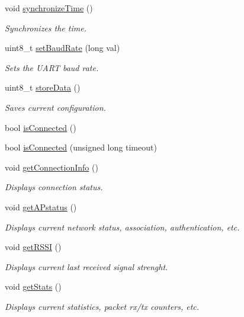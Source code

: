 \begin{DoxyCompactItemize}
void \hyperlink{class_wasp_w_i_f_i_a2820426efd02c54720556c9230cafd41}{synchronize\+Time} ()
\begin{DoxyCompactList}\small\item\em Synchronizes the time. \end{DoxyCompactList}\item 
uint8\+\_\+t \hyperlink{class_wasp_w_i_f_i_ac33882a9b81ce81a5e13577c723faf6c}{set\+Baud\+Rate} (long val)
\begin{DoxyCompactList}\small\item\em Sets the U\+A\+RT baud rate. \end{DoxyCompactList}\item 
uint8\+\_\+t \hyperlink{class_wasp_w_i_f_i_acbf11e3a125d0e28ea1b35343fb8315f}{store\+Data} ()
\begin{DoxyCompactList}\small\item\em Saves current configuration. \end{DoxyCompactList}\item 
bool \hyperlink{class_wasp_w_i_f_i_a2b1a4a23bf96132a0260e8dfe1efff1b}{is\+Connected} ()
\item 
bool \hyperlink{class_wasp_w_i_f_i_ae6651d28e45627cc4f216b1a65e0da00}{is\+Connected} (unsigned long timeout)
\item 
void \hyperlink{class_wasp_w_i_f_i_a79b5ed84f290973589391b372c359961}{get\+Connection\+Info} ()
\begin{DoxyCompactList}\small\item\em Displays connection status. \end{DoxyCompactList}\item 
void \hyperlink{class_wasp_w_i_f_i_a8116a6541cfc005801cbf910aa807eb9}{get\+A\+Pstatus} ()
\begin{DoxyCompactList}\small\item\em Displays current network status, association, authentication, etc. \end{DoxyCompactList}\item 
void \hyperlink{class_wasp_w_i_f_i_a54aad78915e8213e795bb7964e27ab44}{get\+R\+S\+SI} ()
\begin{DoxyCompactList}\small\item\em Displays current last received signal strenght. \end{DoxyCompactList}\item 
void \hyperlink{class_wasp_w_i_f_i_a4ef3e83a50e0ef5237d3907fb0d8e95c}{get\+Stats} ()
\begin{DoxyCompactList}\small\item\em Displays current statistics, packet rx/tx counters, etc. \end{DoxyCompactList}\item 

\end{DoxyCompactItemize}

